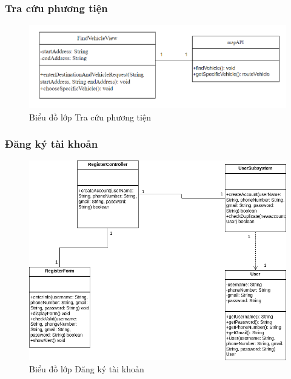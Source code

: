 \subsubsection{Tra cứu phương tiện}
\begin{figure}[H]
    \centering
    \includegraphics[width=\textwidth]{img3.4.2/3.4.2timphuongtien.png} 
    \caption{Biểu đồ lớp Tra cứu phương tiện}
\end{figure}

\subsubsection{Đăng ký tài khoản}
\begin{figure}[H]
    \centering
    \includegraphics[width=\textwidth]{img3.4.2/Design_diagram-Lớp đăng ký.drawio.png} 
    \caption{Biểu đồ lớp Đăng ký tài khoản}
\end{figure}

